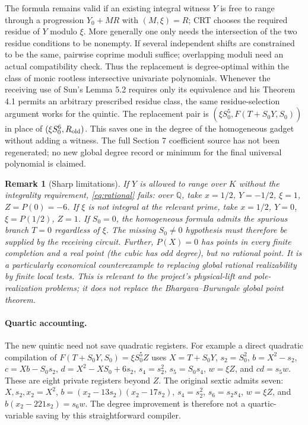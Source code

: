 \documentclass[11pt]{article}
\newtheorem{remark}[theorem]{Remark}
\newcommand{\Q}{\mathbb Q}\newcommand{\Z}{\mathbb Z}\newcommand{\N}{\mathbb N}
\begin{document}
The formula remains valid if an existing integral witness $Y$ is free
to range through a progression $Y_0+MR$ with $(M,\xi)=R$; CRT chooses
the required residue of $Y$ modulo $\xi$. More generally one only needs
the intersection of the two residue conditions to be nonempty. If several
independent shifts are constrained to be the same, pairwise coprime
moduli suffice; overlapping moduli need an actual compatibility check.
Thus the replacement is degree-optimal within the class of monic rootless
intersective univariate polynomials. Whenever the receiving use of Sun's Lemma 5.2 requires only its
equivalence and his Theorem 4.1 permits an arbitrary prescribed residue
class, the same residue-selection argument works for the quintic.
The replacement pair is $(\xi S_0^5,F(T+S_0Y,S_0))$ in place of
$(\xi S_0^6,R_{\rm old})$. This saves one in the degree of the
homogeneous gadget without adding a witness. The full Section 7
coefficient source has not been regenerated; no new global degree
record or minimum for the final universal polynomial is claimed.

\begin{remark}[Sharp limitations]
If $Y$ is allowed to range over $K$ without the integrality requirement,
\eqref{eq:rational} fails: over $\Q$, take $x=1/2$, $Y=-1/2$, $\xi=1$,
$Z=P(0)=-6$. If $\xi$ is not integral at the relevant prime, take
$x=1/2$, $Y=0$, $\xi=P(1/2)$, $Z=1$. If $S_0=0$, the homogeneous
formula admits the spurious branch $T=0$ regardless of $\xi$.
The missing $S_0\ne0$ hypothesis must therefore be supplied by the
receiving circuit. Further, $P(X)=0$ has points in every finite
completion and a real point (the cubic has odd degree), but no rational
point. It is a particularly economical counterexample to replacing
global rational realizability by finite local tests. This is relevant to
the project's physical-lift and pole-realization problems; it does not
replace the Bhargava--Burungale global point theorem.
\end{remark}

\paragraph{Quartic accounting.}
The new quintic need not save quadratic registers. For example a direct
quadratic compilation of $F(T+S_0Y,S_0)=\xi S_0^5 Z$ uses
$X=T+S_0Y$, $s_2=S_0^2$, $b=X^2-s_2$, $c=Xb-S_0s_2$,
$d=X^2-XS_0+6s_2$, $s_4=s_2^2$, $s_5=S_0s_4$, $w=\xi Z$,
and $cd=s_5w$. These are eight private registers beyond $Z$.
The original sextic admits seven: $X,s_2,x_2=X^2$,
$b=(x_2-13s_2)(x_2-17s_2)$, $s_4=s_2^2$, $s_6=s_2s_4$,
$w=\xi Z$, and $b(x_2-221s_2)=s_6w$. The degree improvement is
therefore not a quartic-variable saving by this straightforward compiler.
\end{document}

